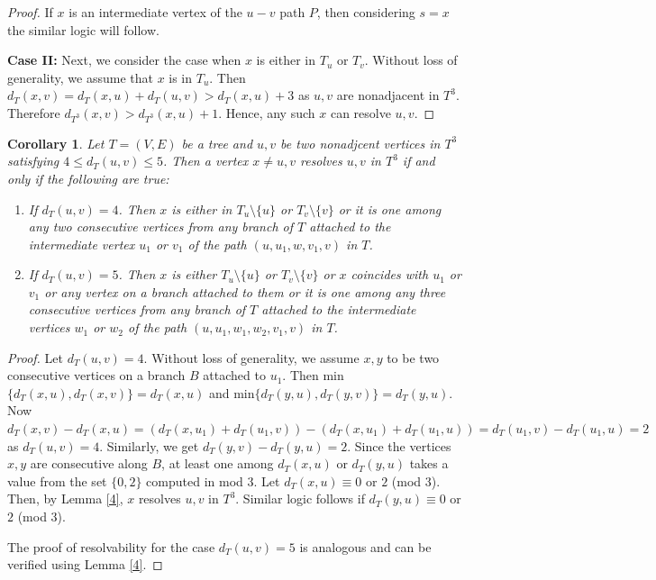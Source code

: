 \documentclass{article}
\newtheorem{cor}[thm]{Corollary}
\theoremstyle{definition}
\numberwithin{equation}{section}
\begin{document}
\begin{proof}
\vspace{0.6em}

\noindent  If $x$ is an intermediate vertex of the $u-v$ path $P$, then considering $s=x$ the similar logic will follow. 

\vspace{0.6em}

\noindent \textbf{Case II:} Next, we consider the case when $x$ is either in $T_{u}$ or $T_{v}$. Without loss of generality, we assume that $x$ is in $T_{u}$. Then $d_{T}(x,v)=d_{T}(x,u)+d_{T}(u,v)>d_{T}(x,u)+3$ as $u,v$ are nonadjacent in $T^{3}$. Therefore $d_{T^{3}}(x,v)>d_{T^{3}}(x,u)+1$. Hence, any such $x$ can resolve $u,v$.
\end{proof}

\begin{cor}\label{four distance}
Let $T=(V,E)$ be a tree and $u,v$ be two nonadjcent vertices
in $T^{3}$ satisfying $4\leq d_{T}(u,v)\leq 5$. Then a vertex $x\neq u,v$ resolves $u,v$ in $T^{3}$ if and only if the following are true:

\begin{enumerate}
\item If $d_{T}(u,v)=4$. Then $x$ is either in $T_{u}\setminus\{u\}$ or $T_{v}\setminus\{v\}$ or it is one among any two consecutive vertices from any branch of $T$ attached to the intermediate vertex $u_{1}$ or $v_{1}$ of the path $(u,u_{1},w,v_{1},v)$ in $T$.

\item If $d_{T}(u,v)=5$. Then $x$ is either $T_{u}\setminus \{u\}$ or $T_{v}\setminus\{v\}$ or $x$ coincides with $u_{1}$ or $v_{1}$ or any vertex on a branch attached to them or it is one among any three consecutive vertices from any branch of $T$ attached to the intermediate vertices $w_{1}$ or $w_{2}$ of the path $(u,u_{1},w_{1}, w_{2}, v_{1},v)$ in $T$.
\end{enumerate}
\end{cor}

\begin{proof}
Let $d_{T}(u,v)=4$. Without loss of generality, we assume $x,y$ to be two consecutive vertices on a branch $B$ attached to $u_{1}$. Then min$\{d_{T}(x,u),d_{T}(x,v)\}=d_{T}(x,u)$ and min$\{d_{T}(y,u),d_{T}(y,v)\}=d_{T}(y,u)$. Now $d_{T}(x,v)-d_{T}(x,u)=(d_{T}(x,u_{1})+d_{T}(u_{1},v))-(d_{T}(x,u_{1})+d_{T}(u_{1},u))=d_{T}(u_{1},v)-d_{T}(u_{1},u)=2$ as $d_{T}(u,v)=4$. Similarly, we get $d_{T}(y,v)-d_{T}(y,u)=2$. Since the vertices $x,y$ are consecutive along $B$, at least one among $d_{T}(x,u)$ or $d_{T}(y,u)$ takes a value from the set $\{0,2\}$ computed in mod $3$. Let $d_{T}(x,u)\equiv 0$ or $2$ (mod $3$). Then, by Lemma \ref{4}, $x$ resolves $u,v$ in $T^{3}$. Similar logic follows if $d_{T}(y,u)\equiv 0$ or $2$ (mod $3$).

\vspace{0.4em}

\noindent The proof of resolvability for the case $d_{T}(u,v)=5$ is analogous and can be verified using Lemma \ref{4}.
\end{proof}
\end{document}
